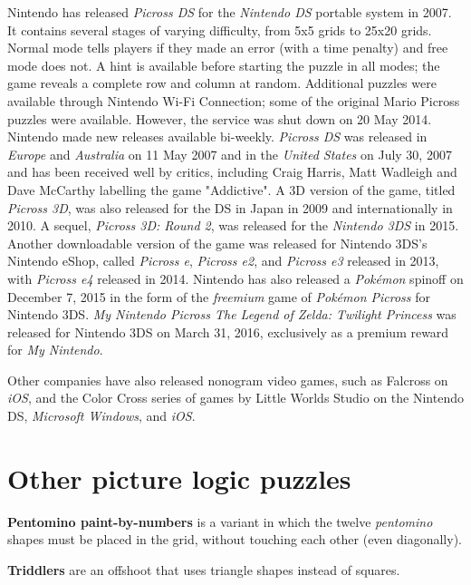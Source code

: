 Nintendo has released \textit{\textit{Picross DS}} for the \textit{Nintendo DS} portable system in 2007. It contains several stages of varying difficulty, from 5x5 grids to 25x20 grids. Normal mode tells players if they made an error (with a time penalty) and free mode does not. A hint is available before starting the puzzle in all modes; the game reveals a complete row and column at random. Additional puzzles were available through Nintendo Wi-Fi Connection; some of the original Mario Picross puzzles were available. However, the service was shut down on 20 May 2014. Nintendo made new releases available bi-weekly. \textit{Picross DS} was released in \textit{Europe} and \textit{Australia} on 11 May 2007 and in the \textit{United States} on July 30, 2007 and has been received well by critics, including Craig Harris,\cite{refer15} Matt Wadleigh\cite{refer16} and Dave McCarthy \cite{refer17} labelling the game "Addictive".\cite{refer18}\cite{refer19} A 3D version of the game, titled \textit{\textit{Picross 3D}}, was also released for the DS in Japan in 2009 and internationally in 2010. A sequel, \textit{\textit{Picross 3D: Round 2}}, was released for the \textit{Nintendo 3DS} in 2015.\cite{refer20} Another downloadable version of the game was released for Nintendo 3DS's Nintendo eShop, called \textit{Picross e}, \textit{Picross e2}, and \textit{Picross e3} released in 2013, with \textit{Picross e4} released in 2014. Nintendo has also released a \textit{Pokémon} spinoff on December 7, 2015 in the form of the \textit{freemium} game of \textit{\textit{Pokémon Picross}} for Nintendo 3DS. \textit{My Nintendo Picross \textit{The Legend of Zelda: Twilight Princess}} was released for Nintendo 3DS on March 31, 2016, exclusively as a premium reward for \textit{My Nintendo}.

Other companies have also released nonogram video games, such as Falcross\cite{refer21} on \textit{iOS}, and the Color Cross series of games by Little Worlds Studio on the Nintendo DS, \textit{Microsoft Windows}, and \textit{iOS}.


\chapter{Other picture logic puzzles}

\textbf{Pentomino paint-by-numbers} is a variant in which the twelve \textit{pentomino} shapes must be placed in the grid, without touching each other (even diagonally).

\textbf{Triddlers}\cite{refer22} are an offshoot that uses triangle shapes instead of squares.

